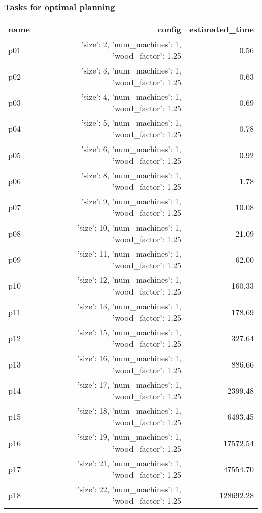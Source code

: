 \documentclass{article}
\begin{document}
                                \subsubsection*{Tasks for optimal planning}
                                
                            \begin{center}
                            \scriptsize
                            \begin{tabular}{@{}l|r|r@{}}
                            name & config & estimated\_time\\\midrule
                              p01&{'size': 2, 'num\_machines': 1, 'wood\_factor': 1.25}&0.56\\
  p02&{'size': 3, 'num\_machines': 1, 'wood\_factor': 1.25}&0.63\\
  p03&{'size': 4, 'num\_machines': 1, 'wood\_factor': 1.25}&0.69\\
  p04&{'size': 5, 'num\_machines': 1, 'wood\_factor': 1.25}&0.78\\
  p05&{'size': 6, 'num\_machines': 1, 'wood\_factor': 1.25}&0.92\\
  p06&{'size': 8, 'num\_machines': 1, 'wood\_factor': 1.25}&1.78\\
  p07&{'size': 9, 'num\_machines': 1, 'wood\_factor': 1.25}&10.08\\
  p08&{'size': 10, 'num\_machines': 1, 'wood\_factor': 1.25}&21.09\\
  p09&{'size': 11, 'num\_machines': 1, 'wood\_factor': 1.25}&62.00\\
  p10&{'size': 12, 'num\_machines': 1, 'wood\_factor': 1.25}&160.33\\
  p11&{'size': 13, 'num\_machines': 1, 'wood\_factor': 1.25}&178.69\\
  p12&{'size': 15, 'num\_machines': 1, 'wood\_factor': 1.25}&327.64\\
  p13&{'size': 16, 'num\_machines': 1, 'wood\_factor': 1.25}&886.66\\
  p14&{'size': 17, 'num\_machines': 1, 'wood\_factor': 1.25}&2399.48\\
  p15&{'size': 18, 'num\_machines': 1, 'wood\_factor': 1.25}&6493.45\\
  p16&{'size': 19, 'num\_machines': 1, 'wood\_factor': 1.25}&17572.54\\
  p17&{'size': 21, 'num\_machines': 1, 'wood\_factor': 1.25}&47554.70\\
  p18&{'size': 22, 'num\_machines': 1, 'wood\_factor': 1.25}&128692.28\\

\end{tabular}
\end{center}
\end{document}
